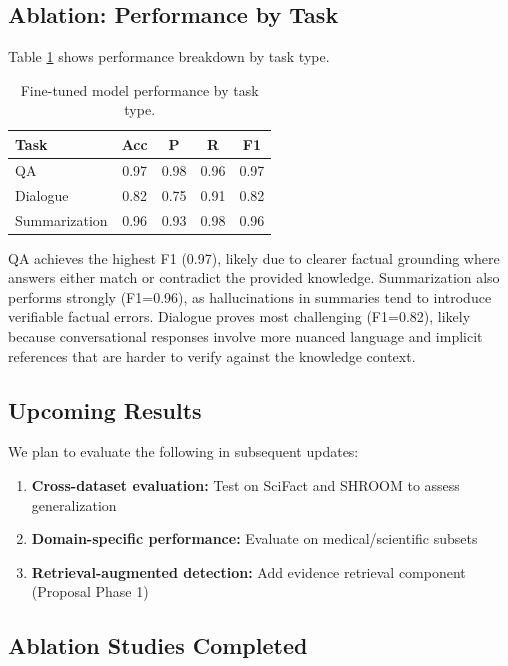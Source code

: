 \documentclass[11pt]{article}
\begin{document}
\subsection{Ablation: Performance by Task}

Table \ref{tab:task_results} shows performance breakdown by task type.

\begin{table}[h]
\centering
\small
\begin{tabular}{lcccc}
\toprule
\textbf{Task} & \textbf{Acc} & \textbf{P} & \textbf{R} & \textbf{F1} \\
\midrule
QA & 0.97 & 0.98 & 0.96 & 0.97 \\
Dialogue & 0.82 & 0.75 & 0.91 & 0.82 \\
Summarization & 0.96 & 0.93 & 0.98 & 0.96 \\
\bottomrule
\end{tabular}
\caption{Fine-tuned model performance by task type.}
\label{tab:task_results}
\end{table}

QA achieves the highest F1 (0.97), likely due to clearer factual grounding where answers either match or contradict the provided knowledge. Summarization also performs strongly (F1=0.96), as hallucinations in summaries tend to introduce verifiable factual errors. Dialogue proves most challenging (F1=0.82), likely because conversational responses involve more nuanced language and implicit references that are harder to verify against the knowledge context.

\subsection{Upcoming Results}

We plan to evaluate the following in subsequent updates:
\begin{enumerate}
    \item \textbf{Cross-dataset evaluation:} Test on SciFact and SHROOM to assess generalization
    \item \textbf{Domain-specific performance:} Evaluate on medical/scientific subsets
    \item \textbf{Retrieval-augmented detection:} Add evidence retrieval component (Proposal Phase 1)
\end{enumerate}

\subsection{Ablation Studies Completed}
\end{document}
